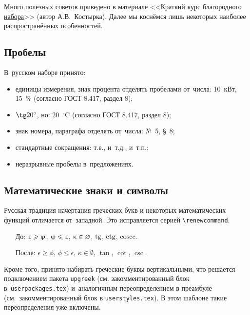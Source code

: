 Много полезных советов приведено в материале
<<\href{http://www.dropbox.com/s/x4hajy4pkw3wdql/wholesome-typesetting.pdf?dl=1\&pv=1}{Краткий курс благородного набора}>> (автор А.\:В.~Костырка).
Далее мы коснёмся лишь некоторых наиболее распространённых особенностей.

\subsection{Пробелы}

В~русском наборе принято:
\begin{itemize}
    \item единицы измерения, знак процента отделять пробелами от~числа: 10~кВт, 15~\% (согласно ГОСТ 8.417, раздел 8);
    \item $\tg 20^\circ$, но: 20~${}^\circ$C (согласно ГОСТ 8.417, раздел 8);
    \item знак номера, параграфа отделять от~числа: №~5, \S~8;
    \item стандартные сокращения: т.\:е., и~т.\:д., и~т.\:п.;
    \item неразрывные пробелы в~предложениях.
\end{itemize}

\subsection{Математические знаки и символы}

Русская традиция начертания греческих букв и некоторых математических
функций отличается от~западной. Это исправляется серией
\verb|\renewcommand|.
\begin{itemize}
    \item[До:] \( \originalepsilon \originalge \originalphi\),
    \(\originalphi \originalleq \originalepsilon\),
    \(\originalkappa \in \originalemptyset\),
    \(\originaltan\),
    \(\originalcot\),
    \(\originalcsc\).
    \item[После:] \( \epsilon \ge \phi\),
    \(\phi \leq \epsilon\),
    \(\kappa \in \emptyset\),
    \(\tan\),
    \(\cot\),
    \(\csc\).
\end{itemize}

Кроме того, принято набирать греческие буквы вертикальными, что
решается подключением пакета \verb|upgreek| (см. закомментированный
блок в~\verb|userpackages.tex|) и~аналогичным переопределением в
преамбуле (см.~закомментированный блок в \verb|userstyles.tex|). В
этом шаблоне такие переопределения уже включены.

